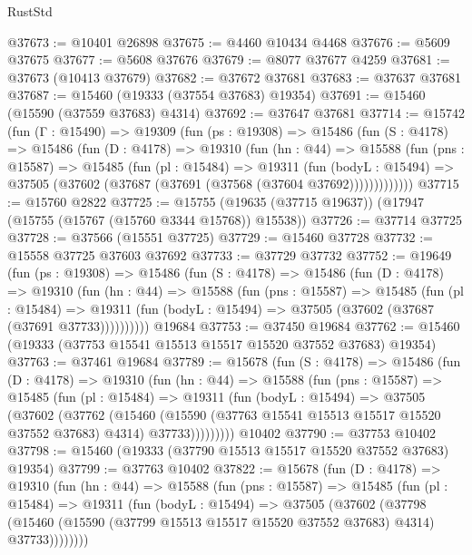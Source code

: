 \begin{lexlean}{RustStd}
\begin{coremodule}
@37673 := @10401 @26898
@37675 := @4460 @10434 @4468
@37676 := @5609 @37675
@37677 := @5608 @37676
@37679 := @8077 @37677 @4259
@37681 := @37673 (@10413 @37679)
@37682 := @37672 @37681
@37683 := @37637 @37681
@37687 := @15460 (@19333 (@37554 @37683) @19354)
@37691 := @15460 (@15590 (@37559 @37683) @4314)
@37692 := @37647 @37681
@37714 := @15742
    (fun (Γ : @15490) =>
    @19309
      (fun (ps : @19308) =>
      @15486
        (fun (S : @4178) =>
        @15486
          (fun (D : @4178) =>
          @19310
            (fun (hn : @44) =>
            @15588
              (fun (pns : @15587) =>
              @15485
                (fun (pl : @15484) =>
                @19311
                  (fun (bodyL : @15494) =>
                  @37505 (@37602 (@37687 (@37691 (@37568 (@37604 @37692)))))))))))))
@37715 := @15760 @2822
@37725 := @15755 (@19635 (@37715 @19637)) (@17947 (@15755 (@15767 (@15760 @3344 @15768)) @15538))
@37726 := @37714 @37725
@37728 := @37566 (@15551 @37725)
@37729 := @15460 @37728
@37732 := @15558 @37725 @37603 @37692
@37733 := @37729 @37732
@37752 := @19649
    (fun (ps : @19308) =>
    @15486
      (fun (S : @4178) =>
      @15486
        (fun (D : @4178) =>
        @19310
          (fun (hn : @44) =>
          @15588
            (fun (pns : @15587) =>
            @15485
              (fun (pl : @15484) =>
              @19311 (fun (bodyL : @15494) => @37505 (@37602 (@37687 (@37691 @37733))))))))))
    @19684
@37753 := @37450 @19684
@37762 := @15460 (@19333 (@37753 @15541 @15513 @15517 @15520 @37552 @37683) @19354)
@37763 := @37461 @19684
@37789 := @15678
    (fun (S : @4178) =>
    @15486
      (fun (D : @4178) =>
      @19310
        (fun (hn : @44) =>
        @15588
          (fun (pns : @15587) =>
          @15485
            (fun (pl : @15484) =>
            @19311
              (fun (bodyL : @15494) =>
              @37505
                (@37602
                  (@37762
                    (@15460
                      (@15590 (@37763 @15541 @15513 @15517 @15520 @37552 @37683) @4314)
                      @37733)))))))))
    @10402
@37790 := @37753 @10402
@37798 := @15460 (@19333 (@37790 @15513 @15517 @15520 @37552 @37683) @19354)
@37799 := @37763 @10402
@37822 := @15678
    (fun (D : @4178) =>
    @19310
      (fun (hn : @44) =>
      @15588
        (fun (pns : @15587) =>
        @15485
          (fun (pl : @15484) =>
          @19311
            (fun (bodyL : @15494) =>
            @37505
              (@37602
                (@37798
                  (@15460 (@15590 (@37799 @15513 @15517 @15520 @37552 @37683) @4314) @37733))))))))

\end{coremodule}
\end{lexlean}
